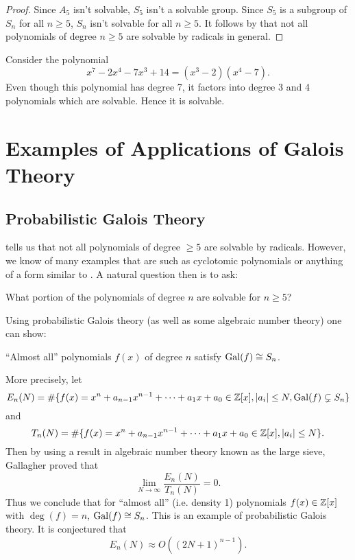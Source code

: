 \documentclass[11pt]{article}
\begin{document}
\begin{proof}
    Since $A_5$ isn't solvable, $S_5$ isn't a solvable group. Since $S_5$ is a subgroup of $S_n$ for all $n\geq 5$, $S_n$ isn't solvable for all $n\geq 5$. It follows by  that not all polynomials of degree $n\geq 5$ are solvable by radicals in general.
    
\end{proof}

\begin{example}
    Consider the polynomial
    \[x^7-2x^4-7x^3+14=(x^3-2)(x^4-7).\]
    Even though this polynomial has degree 7, it factors into degree 3 and 4 polynomials which are solvable. Hence it is solvable.
\end{example}

\pagebreak
\section{Examples of Applications of Galois Theory}

\subsection{Probabilistic Galois Theory}

 tells us that not all polynomials of degree $\geq5$ are solvable by radicals. However, we know of many examples that are such as cyclotomic polynomials or anything of a form similar to . A natural question then is to ask:
\begin{centeremph}[80pt]
    What portion of the polynomials of degree $n$ are solvable for $n\geq 5$?
\end{centeremph}
Using probabilistic Galois theory (as well as some algebraic number theory) one can show:
\begin{centeremph}[80pt]
    ``Almost all'' polynomials $f(x)$ of degree $n$ satisfy $\operatorname{Gal}(f)\cong S_n$.
\end{centeremph}
More precisely, let
\[E_n(N)=\#\{f(x)=x^n+a_{n-1}x^{n-1}+\cdots+a_1x+a_0\in\mathbb{Z}[x],|a_i|\leq N,\operatorname{Gal}(f)\subsetneq S_n\}\]
and
\[T_n(N)=\#\{f(x)=x^n+a_{n-1}x^{n-1}+\cdots+a_1x+a_0\in\mathbb{Z}[x],|a_i|\leq N\}.\]
Then by using a result in algebraic number theory known as the large sieve, Gallagher proved that
\[\lim\limits_{N\to\infty}\frac{E_n(N)}{T_n(N)}=0.\]
Thus we conclude that for ``almost all'' (i.e. density 1) polynomials $f(x)\in\mathbb{Z}[x]$ with $\deg(f)=n$, $\operatorname{Gal}(f)\cong S_n$. This is an example of probabilistic Galois theory. It is conjectured that
\[E_n(N)\approx O((2N+1)^{n-1}).\]
\end{document}

